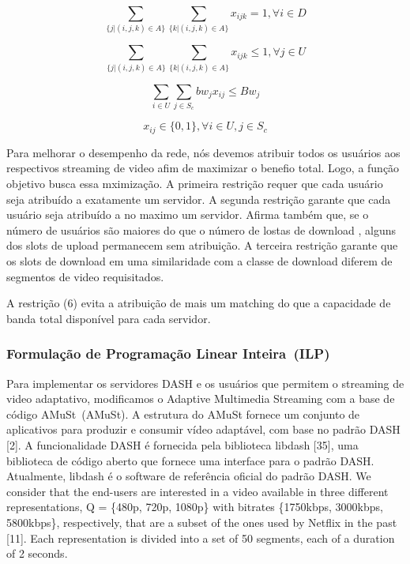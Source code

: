 \begin{equation}\label{bound_1}
\sum_{\{j | (i,j,k) \in A\}}
\sum_{\{k | (i,j,k) \in A\}}
x_{ijk} = 1,  \forall i \in D
\end{equation}

\begin{equation}\label{bound_1}
\sum_{\{j | (i,j,k) \in A\}}
\sum_{\{k | (i,j,k) \in A\}}
x_{ijk} \leq 1,  \forall j \in U
\end{equation}

\begin{equation}\label{minimize}
\sum_{i \in U} 
\sum_{j \in S_{c}}
bw_{j} x_{ij}
\leq Bw_{j}
\end{equation}

\begin{equation}\label{minimize}
x_{ij}  \in  \{0, 1\}, \forall i \in U,j \in S_{c}
\end{equation}
\vspace{1.2cm}

Para melhorar o desempenho da rede, nós devemos atribuir todos os usuários aos respectivos streaming de video afim de maximizar o benefio total.
Logo, a função objetivo busca essa mximização. A primeira restrição requer que cada usuário seja atribuído a exatamente um servidor. A segunda restrição garante que cada usuário seja atribuído a no maximo um servidor. Afirma também que, se o número de usuários são maiores do que o número de lostas de download , alguns dos slots de upload permanecem sem atribuição. A terceira restrição garante que os slots de download em uma similaridade com a classe de download diferem de segmentos de video requisitados.

A restrição (6) evita a atribuição de mais um matching do que a capacidade de banda total disponível para cada servidor.

\subsubsection{Formulação de Programação Linear Inteira~(ILP)}
\label{subsec:applications}


Para implementar os servidores DASH e os usuários que permitem o streaming de video adaptativo, modificamos o  Adaptive Multimedia Streaming com a base de código AMuSt~(AMuSt). 
A estrutura do AMuSt fornece um conjunto de aplicativos para produzir e consumir vídeo adaptável, com base no padrão DASH [2]. A funcionalidade DASH é fornecida pela biblioteca libdash [35], uma biblioteca de código aberto que fornece uma interface para o padrão DASH. Atualmente, libdash é o software de referência oficial do padrão DASH.
We consider that the end-users are interested in a video available in three different representations, Q = \{480p, 720p, 1080p\} with bitrates \{1750kbps, 3000kbps, 5800kbps\}, respectively, that are a subset of the ones used by Netflix in the past [11]. Each representation is divided into a set of 50 segments, each of a duration of 2 seconds.


